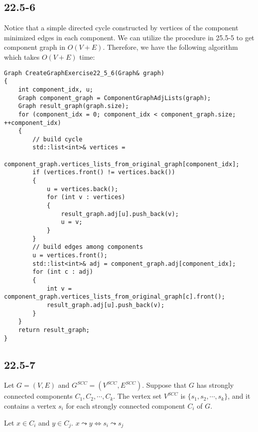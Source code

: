 \subsection*{22.5-6}

Notice that a simple directed cycle constructed by vertices of the component
minimized edges in each component.
We can utilize the procedure in 25.5-5 to get component graph in $O(V + E)$.
Therefore, we have the following algorithm which takes $O(V + E)$ time:

\begin{verbatim}
Graph CreateGraphExercise22_5_6(Graph& graph)
{
    int component_idx, u;
    Graph component_graph = ComponentGraphAdjLists(graph);
    Graph result_graph(graph.size);
    for (component_idx = 0; component_idx < component_graph.size; ++component_idx)
    {
        // build cycle
        std::list<int>& vertices = 
            component_graph.vertices_lists_from_original_graph[component_idx];
        if (vertices.front() != vertices.back())
        {
            u = vertices.back();
            for (int v : vertices)
            {
                result_graph.adj[u].push_back(v);
                u = v;
            }
        }
        // build edges among components
        u = vertices.front();
        std::list<int>& adj = component_graph.adj[component_idx];
        for (int c : adj)
        {
            int v = component_graph.vertices_lists_from_original_graph[c].front();
            result_graph.adj[u].push_back(v);
        }
    }
    return result_graph;
}
\end{verbatim}

\subsection*{22.5-7}

Let $G = (V,E)$ and $G^{SCC} = (V^{SCC},E^{SCC})$.
Suppose that $G$ has strongly connected components $C_1,C_2,\cdots,C_k$.
The vertex set $V^{SCC}$ is $\{ s_1, s_2, \cdots, s_k \}$,
and it contains a vertex $s_i$ for each strongly connected component $C_i$ of $G$.

\begin{lemma}
    Let $x \in C_i$ and $y \in C_j$.
    $x \leadsto y \Longleftrightarrow s_i \leadsto s_j$ 
\end{lemma}

